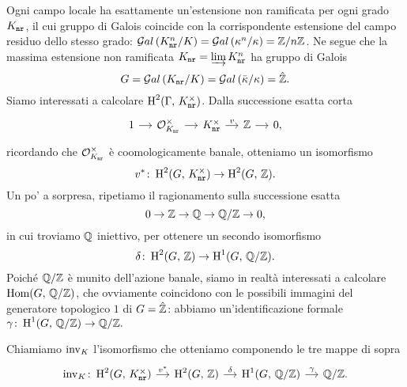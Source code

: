 Ogni campo locale ha esattamente un'estensione non ramificata per ogni grado $ K_\mathtt{nr} $, il cui gruppo di Galois coincide con la corrispondente estensione del campo residuo dello stesso grado: $ \mathcal{G}al\left( K^n_\texttt{nr} / K \right) = \mathcal{G}al\left( \kappa^n / \kappa \right) = \mathbb{Z} / n\mathbb{Z} $. Ne segue che la massima estensione non ramificata $ K_\mathtt{nr} = \varinjlim K^n_\texttt{nr} $ ha gruppo di Galois
\[ G = \mathcal{G}al\left( K_\mathtt{nr} / K \right) = \mathcal{G}al\left( \bar{\kappa} / \kappa \right) = \hat{\mathbb{Z}}. \]
Siamo interessati a calcolare $ \operatorname{H}^2(\Gamma, \, K_\mathtt{nr}^\times) $. Dalla successione esatta corta
\[ \begin{tikzcd}[column sep = small]
1 \rar
& \mathcal{O}_{\knr}^\times \rar
& \knr^\times \rar["v"]
& \Z \rar
& 0,
\end{tikzcd} \]
ricordando che $ \mathcal{O}_{K_\mathtt{nr}}^\times $ è coomologicamente banale, otteniamo un isomorfismo
\[ v^* \colon \operatorname{H}^2(G, \, K_\mathtt{nr}^\times) \to \operatorname{H}^2(G, \, \mathbb{Z}). \]
Un po' a sorpresa, ripetiamo il ragionamento sulla successione esatta
\[ 0 \to \mathbb{Z} \to \mathbb{Q} \to \mathbb{Q}/\mathbb{Z} \to 0, \]
in cui troviamo $ \mathbb{Q} $ iniettivo, per ottenere un secondo isomorfismo
\[ \delta \colon \operatorname{H}^2(G, \, \mathbb{Z}) \to \operatorname{H}^1(G, \, \mathbb{Q}/\mathbb{Z}). \]
Poiché $ \mathbb{Q}/\mathbb{Z} $ è munito dell'azione banale, siamo in realtà interessati a calcolare $ \operatorname{Hom}(G, \, \mathbb{Q}/\mathbb{Z}) $, che ovviamente coincidono con le possibili immagini del generatore topologico $ 1 $ di $ G = \hat{\mathbb{Z}} $: abbiamo un'identificazione formale $ \gamma \colon \operatorname{H}^1(G, \, \mathbb{Q}/\mathbb{Z}) \to \mathbb{Q}/\mathbb{Z}.  $

\begin{definition}
	Chiamiamo $ \operatorname{inv}_K $ l'isomorfismo che otteniamo componendo le tre mappe di sopra
	\[ \begin{tikzcd}[column sep = small]
	\inv_\K \colon \HH^2(G, \, \knr^\times)  \rar["v^*"]
	& \HH^2(G, \, \Z) \rar["\delta"]
	& \HH^1(G, \, \Q/\Z) \rar["\gamma"]
	& \Q/\Z.
	\end{tikzcd} \]
\end{definition}

